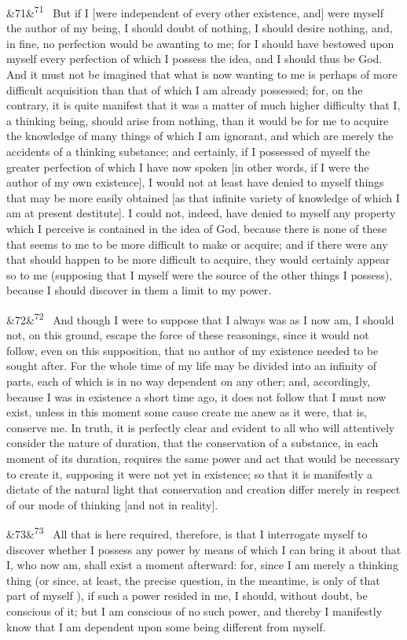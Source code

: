 \documentclass[12pt]{article}
\newcommand{\para}[1][]{\par\noindent\ifx&#1&\else\textsuperscript{\footnotesize #1}~\fi}
\begin{document}
\para[71] But if I [were independent of every other existence, and] were myself the author of my being, I should doubt of nothing, I should desire nothing, and, in fine, no perfection would be awanting to me; for I should have bestowed upon myself every perfection of which I possess the idea, and I should thus be God. And it must not be imagined that what is now wanting to me is perhaps of more difficult acquisition than that of which I am already possessed; for, on the contrary, it is quite manifest that it was a matter of much higher difficulty that I, a thinking being, should arise from nothing, than it would be for me to acquire the knowledge of many things of which I am ignorant, and which are merely the accidents of a thinking substance; and certainly, if I possessed of myself the greater perfection of which I have now spoken [in other words, if I were the author of my own existence], I would not at least have denied to myself things that may be more easily obtained [as that infinite variety of knowledge of which I am at present destitute]. I could not, indeed, have denied to myself any property which I perceive is contained in the idea of God, because there is none of these that seems to me to be more difficult to make or acquire; and if there were any that should happen to be more difficult to acquire, they would certainly appear so to me (supposing that I myself were the source of the other things I possess), because I should discover in them a limit to my power.

\para[72] And though I were to suppose that I always was as I now am, I should not, on this ground, escape the force of these reasonings, since it would not follow, even on this supposition, that no author of my existence needed to be sought after. For the whole time of my life may be divided into an infinity of parts, each of which is in no way dependent on any other; and, accordingly, because I was in existence a short time ago, it does not follow that I must now exist, unless in this moment some cause create me anew as it were, that is, conserve me. In truth, it is perfectly clear and evident to all who will attentively consider the nature of duration, that the conservation of a substance, in each moment of its duration, requires the same power and act that would be necessary to create it, supposing it were not yet in existence; so that it is manifestly a dictate of the natural light that conservation and creation differ merely in respect of our mode of thinking [and not in reality].

\para[73] All that is here required, therefore, is that I interrogate myself to discover whether I possess any power by means of which I can bring it about that I, who now am, shall exist a moment afterward: for, since I am merely a thinking thing (or since, at least, the precise question, in the meantime, is only of that part of myself ), if such a power resided in me, I should, without doubt, be conscious of it; but I am conscious of no such power, and thereby I manifestly know that I am dependent upon some being different from myself.
\end{document}
